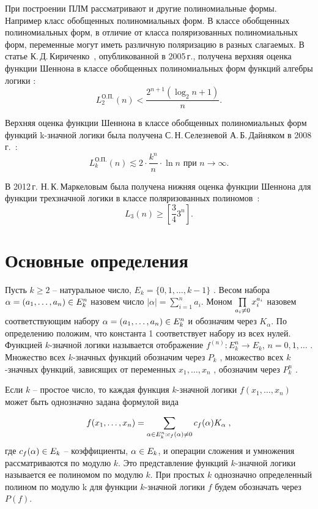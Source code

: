 \documentclass[a4paper, 12pt]{extarticle}
\def\neq{\not=\nobreak\discretionary{}{\usefont{OMS}{cmsy}{m}{n}\char54\usefont{OT1}{cmr}{m}{n}\char61}{}}
\def\in{\mathchar"3232\nobreak\discretionary{}{\usefont{OMS}{cmsy}{m}{n}\char50}{}}
\begin{document}
При построении ПЛМ рассматривают и другие полиномиальные формы. Например класс обобщенных полиномиальных форм.
В классе обобщенных полиномиальных форм, в отличие от класса поляризованных полиномиальных форм, переменные могут иметь
различную поляризацию в разных слагаемых. В статье К.\,Д.\,Кириченко~\cite{kk05}, опубликованной в 2005\,г., получена верхняя оценка
функции Шеннона в классе обобщенных полиномиальных форм функций алгебры логики :
$$
L^{\text{О.П.}}_2(n) < \frac{2 ^ {n + 1}(\log_2n+1)}{n}.
$$

Верхняя оценка функции Шеннона в классе обобщенных полиномиальных форм функций k\nobreakdash-значной логики была получена
С.\,Н.\,Селезневой А.\,Б.\,Дайняком в 2008\,г.~\cite{sd08}:
$$
L^{\text{О.П.}}_k(n) \lesssim 2\cdot\frac{k ^ n}{n}\cdot \ln n \text{ при } n \rightarrow \infty.
$$

В 2012\,г. Н.\,К.\,Маркеловым была получена нижняя оценка функции Шеннона для функции трехзначной логики в классе
поляризованных полиномов~\cite{mn12}:
$$
L_3(n) \geqslant \left[\frac{3}{4}3^n\right].
$$

\section{Основные определения}

Пусть $k \geqslant 2$ -- натуральное число,
$E_k = \{0, 1, \dots, k - 1\}$
. Весом набора
$\alpha = (a_1, \dots, a_n ) \in E_k^n$ назовем число $|\alpha| = \sum\limits_{i=1}^n a_i$.
Моном $\prod\limits_{a_i\neq0}x_i^{a_i}$ назовем соответствующим набору $\alpha = (a_1, \dots, a_n ) \in E_k^n$ и обозначим
через $K_{\alpha}$. По определению положим, что константа 1 соответствует набору из всех нулей.
Функцией $k$\nobreakdash-значной логики называется отображение $f^{(n)} : E_k^n \rightarrow E_k$,
$n = 0, 1, \dots$ . Множество всех $k$\nobreakdash-значных функций обозначим через $P_k$ , множество
всех $k$\nobreakdash-значных функций, зависящих от переменных $x_1, \dots, x_n$ , обозначим через $P_k^n$ .

Если $k$ -- простое число, то каждая функция $k$\nobreakdash-значной логики $f(x_1 , \dots , x_n)$
может быть однозначно задана формулой вида

$$ f(x_1, \dots, x_n) = \sum_{\alpha \in E_k^n:c_f(\alpha) \neq 0}c_f(\alpha)K_\alpha \; ,$$
где $c_f(\alpha) \in E_k$ -- коэффициенты, $\alpha \in E_k$, и операции сложения и умножения
рассматриваются по модулю $k$. Это представление функций $k$\nobreakdash-значной
логики называется ее полиномом по модулю $k$. При простых $k$ однозначно
определенный полином по модулю k для функции $k$\nobreakdash-значной логики $f$ будем
обозначать через $P(f)$.
\end{document}
